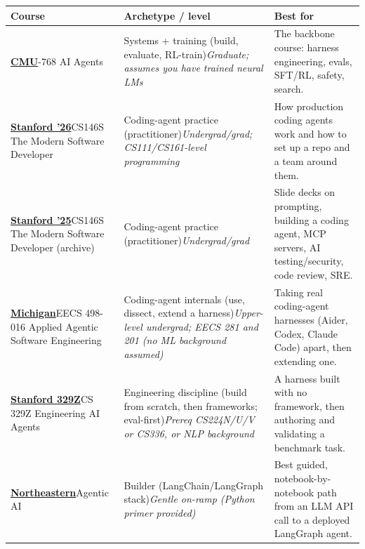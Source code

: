 \documentclass[10pt,oneside]{report}
\begin{document}
{\footnotesize\begin{longtable}{P{3.6cm} P{4.4cm} P{7.6cm}}
\toprule Course & Archetype / level & Best for\\ \midrule\endhead
\hyperlink{course-CMU}{\textbf{CMU}}-768 AI Agents & Systems + training (build, evaluate, RL-train)\newline\emph{Graduate; assumes you have trained neural LMs} & The backbone course: harness engineering, evals, SFT/RL, safety, search.\\ \midrule
\hyperlink{course-STAN26}{\textbf{Stanford '26}}\newline CS146S The Modern Software Developer & Coding-agent practice (practitioner)\newline\emph{Undergrad/grad; CS111/CS161-level programming} & How production coding agents work and how to set up a repo and a team around them.\\ \midrule
\hyperlink{course-STAN25}{\textbf{Stanford '25}}\newline CS146S The Modern Software Developer (archive) & Coding-agent practice (practitioner)\newline\emph{Undergrad/grad} & Slide decks on prompting, building a coding agent, MCP servers, AI testing/security, code review, SRE.\\ \midrule
\hyperlink{course-UMICH}{\textbf{Michigan}}\newline EECS 498-016 Applied Agentic Software Engineering & Coding-agent internals (use, dissect, extend a harness)\newline\emph{Upper-level undergrad; EECS 281 and 201 (no ML background assumed)} & Taking real coding-agent harnesses (Aider, Codex, Claude Code) apart, then extending one.\\ \midrule
\hyperlink{course-S329Z}{\textbf{Stanford 329Z}}\newline CS 329Z Engineering AI Agents & Engineering discipline (build from scratch, then frameworks; eval-first)\newline\emph{Prereq CS224N/U/V or CS336, or NLP background} & A harness built with no framework, then authoring and validating a benchmark task.\\ \midrule
\hyperlink{course-NEU}{\textbf{Northeastern}}\newline Agentic AI & Builder (LangChain/LangGraph stack)\newline\emph{Gentle on-ramp (Python primer provided)} & Best guided, notebook-by-notebook path from an LLM API call to a deployed LangGraph agent.\\ \midrule

\end{longtable}}
\end{document}
